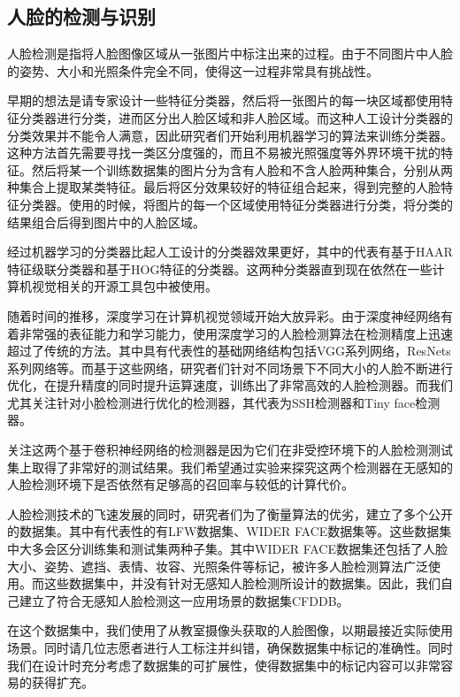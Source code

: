 \subsection{人脸的检测与识别}

人脸检测是指将人脸图像区域从一张图片中标注出来的过程。由于不同图片中人脸的姿势、大小和光照条件完全不同，使得这一过程非常具有挑战性。

早期的想法是请专家设计一些特征分类器，然后将一张图片的每一块区域都使用特征分类器进行分类，进而区分出人脸区域和非人脸区域。而这种人工设计分类器的分类效果并不能令人满意，因此研究者们开始利用机器学习的算法来训练分类器。这种方法首先需要寻找一类区分度强的，而且不易被光照强度等外界环境干扰的特征。然后将某一个训练数据集的图片分为含有人脸和不含人脸两种集合，分别从两种集合上提取某类特征。最后将区分效果较好的特征组合起来，得到完整的人脸特征分类器。使用的时候，将图片的每一个区域使用特征分类器进行分类，将分类的结果组合后得到图片中的人脸区域。

经过机器学习的分类器比起人工设计的分类器效果更好，其中的代表有基于HAAR特征级联分类器\cite{viola2004robust}和基于HOG特征的分类器\cite{dalal2005histograms}。这两种分类器直到现在依然在一些计算机视觉相关的开源工具包中被使用。

随着时间的推移，深度学习在计算机视觉领域开始大放异彩。由于深度神经网络有着非常强的表征能力和学习能力，使用深度学习的人脸检测算法在检测精度上迅速超过了传统的方法。其中具有代表性的基础网络结构包括VGG系列网络\cite{simonyan2014very}，ResNets系列网络\cite{he2016deep}等。而基于这些网络，研究者们针对不同场景下不同大小的人脸不断进行优化，在提升精度的同时提升运算速度，训练出了非常高效的人脸检测器。而我们尤其关注针对小脸检测进行优化的检测器，其代表为SSH检测器\cite{najibi2017ssh}和Tiny face检测器\cite{hu2017finding}。

关注这两个基于卷积神经网络的检测器是因为它们在非受控环境下的人脸检测测试集上取得了非常好的测试结果。我们希望通过实验来探究这两个检测器在无感知的人脸检测环境下是否依然有足够高的召回率与较低的计算代价。

人脸检测技术的飞速发展的同时，研究者们为了衡量算法的优劣，建立了多个公开的数据集。其中有代表性的有LFW数据集\cite{huang2007labeled}、WIDER FACE数据集\cite{yang2016wider}等。这些数据集中大多会区分训练集和测试集两种子集。其中WIDER FACE数据集还包括了人脸大小、姿势、遮挡、表情、妆容、光照条件等标记，被许多人脸检测算法广泛使用。而这些数据集中，并没有针对无感知人脸检测所设计的数据集。因此，我们自己建立了符合无感知人脸检测这一应用场景的数据集CFDDB。

在这个数据集中，我们使用了从教室摄像头获取的人脸图像，以期最接近实际使用场景。同时请几位志愿者进行人工标注并纠错，确保数据集中标记的准确性。同时我们在设计时充分考虑了数据集的可扩展性，使得数据集中的标记内容可以非常容易的获得扩充。


